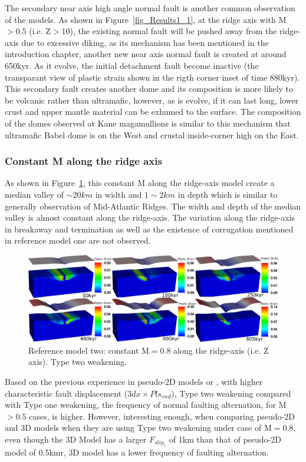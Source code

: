 The secondary near axis high angle normal fault is another common observation of the models. As shown in Figure~\ref{fig_Results1_1}, at the ridge axis with M$>0.5$ (i.e. Z$>10$), the existing normal fault will be pushed away from the ridge-axis due to excessive diking, as its mechanism has been mentioned in the introduction chapter, another new near axis normal fault is created at around 650kyr. As it evolve, the initial detachment fault become inactive (the transparant view of plastic strain shown in the rigth corner inset of time 880kyr). This secondary fault creates another dome and its composition is more likely to be volcanic rather than ultramafic, however, as is evolve, if it can last long, lower crust and upper mantle material can be exhumed to the surface. The composition of the domes observed at Kane magamullions is similar to this mechanism that ultramafic Babel dome is on the West and crustal inside-corner high on the East.    

\subsubsection{Constant M along the ridge axis }

As shown in Figure~\ref{fig_Results1_3}, this constant M along the ridge-axis model create a median valley of $\sim 20km$ in width and $1\sim2km$ in depth which is similar to generally observation of Mid-Atlantic Ridges. The width and depth of the median valley is almost constant along the ridge-axis. The variation along the ridge-axis in breakaway and termination as well as the existence of corrugation mentioned in reference model one are not observed. 
\begin{figure}[H]
  \centering
    \includegraphics[width=1.0\textwidth]{fig_Results1_3.eps}
  \caption{Reference model two: constant M$=0.8$ along the ridge-axis (i.e. Z axis). Type two weakening.}
 \label{fig_Results1_3}
\end{figure}   

Based on the previous experience in pseudo-2D models or \citep{Lavier2000}, with higher characteristic fault displacement ($3dx \times Pls_{end}$), Type two weakening compared with Type one weakening, the frequency of normal faulting alternation, for M$>0.5$ cases, is higher. However, interesting enough, when comparing pseudo-2D and 3D models when they are using Type two weakening under case of M$=0.8$, even though the 3D Model has a larger $F_{slip_{c}}$ of 1km than that of pseudo-2D model of 0.5kmr, 3D model has a lower frequency of faulting alternation. 

